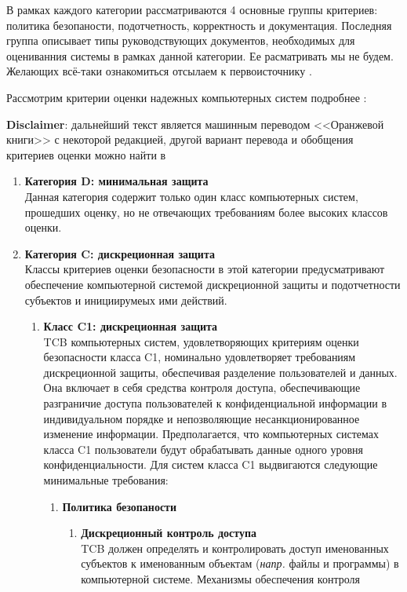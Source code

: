 В рамках каждого категории рассматриваются 4 основные группы критериев: политика безопаности, подотчетность, корректность и документация. Последняя группа описывает типы руководствующих 
документов, необходимых для оцениванния системы в рамках данной категории. Ее расматривать мы не будем. Желающих всё-таки ознакомиться отсылаем к первоисточнику \cite{OrangeBook}.

Рассмотрим критерии оценки надежных компьютерных систем подробнее \cite[Part 1]{OrangeBook}:

\textbf{Disclaimer}: дальнейший текст является машинным переводом <<Оранжевой книги>> с некоторой редакцией, другой вариант перевода и 
обобщения критериев оценки можно найти в \cite{OrangeBookTranslation}

\begin{enumerate}
	\item{\textbf{Категория D: минимальная защита}}\\
	Данная категория содержит только один класс компьютерных систем, прошедших оценку, но не отвечающих требованиям более высоких классов оценки.
	\item{\textbf{Категория C: дискреционная защита}}\\
	Классы критериев оценки безопасности в этой категории предусматривают обеспечение компьютерной системой дискреционной защиты и подотчетности субъектов и инициирумеых ими действий.
	\begin{enumerate}
		\item{\textbf{Класс C1: дискреционная защита}}\\
		TCB компьютерных систем, удовлетворяющих критериям оценки безопасности класса C1, номинально удовлетворяет требованиям дискреционной защиты, обеспечивая разделение пользователей и данных.
		Она включает в себя средства контроля доступа, обеспечивающие разграничие доступа пользователей к конфиденциальной информации в индивидуальном порядке и непозволяющие несанкционированное
		изменение информации. Предполагается, что компьютерных системах класса C1 пользователи будут обрабатывать данные одного уровня конфиденциальности. Для систем класса C1 выдвигаются следующие
		минимальные требования:
		\begin{enumerate}
			\item{\textbf{Политика безопаности}}
			\begin{enumerate}
				\item{\textbf{Дискреционный контроль доступа}}\\
				TCB должен определять и контролировать доступ именованных субъектов к именованным объектам (\textit{напр.} файлы и программы) в компьютерной системе. Механизмы обеспечения контроля

\end{enumerate}
\end{enumerate}
\end{enumerate}
\end{enumerate}
